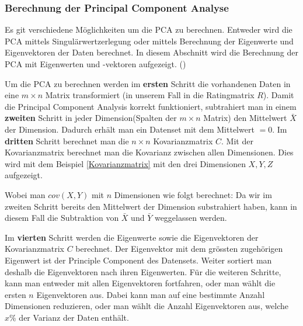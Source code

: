 \subsubsection{Berechnung der Principal Component Analyse}
\label{sec: Berechnung PCA}
Es git verschiedene Möglichkeiten um die PCA zu berechnen. Entweder wird die PCA mittels Singulärwertzerlegung  oder mittels Berechnung der Eigenwerte und Eigenvektoren der Daten berechnet. In diesem Abschnitt wird die Berechnung der PCA mit Eigenwerten und -vektoren aufgezeigt. (\cite{principa25:online})


Um die PCA zu berechnen werden im \textbf{ersten} Schritt die vorhandenen Daten in eine $m\times n$ Matrix transformiert (in unserem Fall in die Ratingmatrix $R$). Damit die Principal Component Analysis korrekt funktioniert, subtrahiert man in einem \textbf{zweiten} Schritt in jeder Dimension(Spalten der $m \times n$ Matrix) den Mittelwert $\bar{X}$ der Dimension.  Dadurch erhält man ein Datenset mit dem Mittelwert $= 0$.
Im \textbf{dritten} Schritt berechnet man die $n\times n$ Kovarianzmatrix $C$. Mit der Kovarianzmatrix berechnet man die Kovarianz zwischen allen Dimensionen. Dies wird mit dem Beispiel \eqref{Kovarianzmatrix} mit den drei Dimensionen $X,Y,Z$ aufgezeigt.


Wobei man ${cov}(X,Y)$ mit $n$ Dimensionen wie folgt berechnet:
Da wir im zweiten Schritt bereits den Mittelwert der Dimension substrahiert haben, kann in diesem Fall die Subtraktion von $\bar{X}$ und $\bar{Y}$ weggelassen werden.

Im \textbf{vierten} Schritt werden die Eigenwerte sowie die Eigenvektoren der Kovarianzmatrix $C$ berechnet.
Der Eigenvektor mit dem grössten zugehörigen Eigenwert ist der Principle Component des Datensets. Weiter sortiert man deshalb die Eigenvektoren nach ihren Eigenwerten.
Für die weiteren Schritte, kann man entweder mit allen Eigenvektoren fortfahren, oder man wählt die ersten $n$ Eigenvektoren aus. Dabei kann man auf eine bestimmte Anzahl Dimensionen reduzieren, oder man wählt die Anzahl Eigenvektoren aus, welche $x\%$ der Varianz der Daten enthält.
